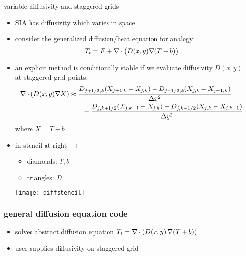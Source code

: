 \begin{frame}{variable diffusivity and staggered grids}

\begin{itemize}
  \item SIA has diffusivity which varies in space
  \item consider the generalized diffusion/heat equation for analogy:
     $$T_t = F + \nabla\cdot \big(D(x,y) \nabla (T+b)\big)$$
  \item an explicit method is conditionally stable if we evaluate diffusivity $D(x,y)$ at \alert{staggered} grid points:
  \small
\begin{align*}
\nabla\cdot \left(D(x,y) \nabla X\right) &\approx \frac{D_{j+1/2,k}(X_{j+1,k} - X_{j,k}) - D_{j-1/2,k}(X_{j,k} - X_{j-1,k})}{\Delta x^2} \\
	&\qquad + \frac{D_{j,k+1/2}(X_{j,k+1} - X_{j,k}) - D_{j,k-1/2}(X_{j,k} - X_{j,k-1})}{\Delta y^2}
\end{align*}
\normalsize
where $X=T+b$
\item in stencil at right $\longrightarrow$
    \begin{itemize}
    \item[] diamonds: $T,b$
    \item[] triangles: $D$
    \end{itemize}

\vspace{-15mm}
\hfill \texttt{[image: diffstencil]}
\end{itemize}
\end{frame}


\begin{frame}
  \frametitle{general diffusion equation code}


\small
\begin{itemize}
\item solves abstract diffusion equation $T_t = \nabla\cdot \left(D(x,y)\, \nabla (T+b)\right)$
\item user supplies diffusivity on staggered grid
\end{itemize}
\end{frame}


